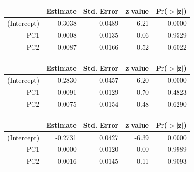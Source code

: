\documentclass[a4paper,12pt]{Latex/Classes/PhDthesisPSnPDF}
\begin{document}
\begin{center}
\begin{table}[ht]
\centering
\begin{tabular}{rrrrr}
  \hline
 & Estimate & Std. Error & z value & Pr($>$$|$z$|$) \\ 
  \hline
(Intercept) & -0.3038 & 0.0489 & -6.21 & 0.0000 \\ 
  PC1 & -0.0008 & 0.0135 & -0.06 & 0.9529 \\ 
  PC2 & -0.0087 & 0.0166 & -0.52 & 0.6022 \\ 
   \hline
\end{tabular}
\end{table}\end{center}

\newpage

\begin{center}
\begin{table}[ht]
\centering
\begin{tabular}{rrrrr}
  \hline
 & Estimate & Std. Error & z value & Pr($>$$|$z$|$) \\ 
  \hline
(Intercept) & -0.2830 & 0.0457 & -6.20 & 0.0000 \\ 
  PC1 & 0.0091 & 0.0129 & 0.70 & 0.4823 \\ 
  PC2 & -0.0075 & 0.0154 & -0.48 & 0.6290 \\ 
   \hline
\end{tabular}
\end{table}\end{center}

\begin{center}
\begin{table}[ht]
\centering
\begin{tabular}{rrrrr}
  \hline
 & Estimate & Std. Error & z value & Pr($>$$|$z$|$) \\ 
  \hline
(Intercept) & -0.2731 & 0.0427 & -6.39 & 0.0000 \\ 
  PC1 & -0.0000 & 0.0120 & -0.00 & 0.9989 \\ 
  PC2 & 0.0016 & 0.0145 & 0.11 & 0.9093 \\ 
   \hline
\end{tabular}
\end{table}\end{center}
\end{document}
